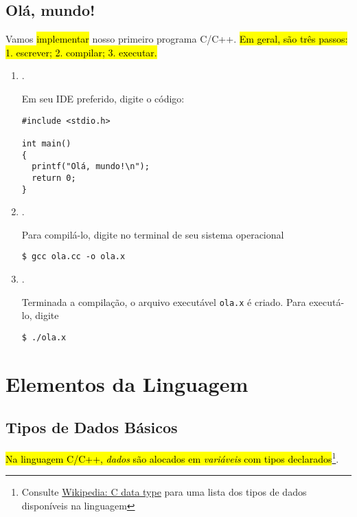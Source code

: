 \documentclass[12pt]{article}
\begin{document}
\subsection{Olá, mundo!}

Vamos \hl{implementar} nosso primeiro programa C/C++. \hl{Em geral, são três passos: 1. escrever; 2. compilar; 3. executar.}

\begin{enumerate}[1.]
\item {}.

  Em seu IDE preferido, digite o código:
\begin{lstlisting}[caption=ola.cc, label=cod:ola]
#include <stdio.h>

int main()
{
  printf("Olá, mundo!\n");
  return 0;
}
\end{lstlisting}
  
\item {}.

Para compilá-lo, digite no terminal de seu sistema operacional
\begin{lstlisting}
$ gcc ola.cc -o ola.x
\end{lstlisting}

\item {}.

Terminada a compilação, o arquivo executável \lstinline+ola.x+ é criado. Para executá-lo, digite
\begin{lstlisting}
$ ./ola.x
\end{lstlisting}  
\end{enumerate}


\section{Elementos da Linguagem}\label{sec_elem}

\subsection{Tipos de Dados Básicos}

\hl{Na linguagem C/C++, \emph{dados} são alocados em \emph{variáveis} com tipos declarados}\footnote{Consulte \href{https://en.wikipedia.org/wiki/C_data_types}{Wikipedia: C data type} para uma lista dos tipos de dados disponíveis na linguagem}.
\end{document}
